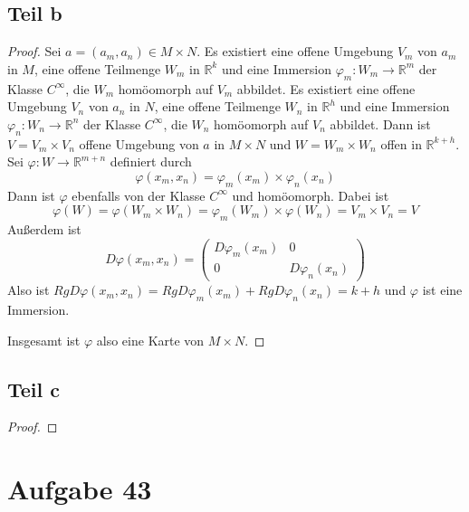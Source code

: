 \documentclass[10pt,a4paper]{article}
\begin{document}
\subsection{Teil b}
\begin{proof}
  Sei $a = (a_{m}, a_{n}) \in M \times N$.
  Es existiert eine offene Umgebung $V_{m}$ von $a_{m}$ in $M$, eine offene Teilmenge $W_{m}$ in $\mathbb{R}^{k}$ und eine Immersion $\varphi_{m} : W_{m} \rightarrow \mathbb{R}^{m}$ der Klasse $C^{\infty}$, die $W_{m}$ homöomorph auf $V_{m}$ abbildet.
  Es existiert eine offene Umgebung $V_{n}$ von $a_{n}$ in $N$, eine offene Teilmenge $W_{n}$ in $\mathbb{R}^{h}$ und eine Immersion $\varphi_{n} : W_{n} \rightarrow \mathbb{R}^{n}$ der Klasse $C^{\infty}$, die $W_{n}$ homöomorph auf $V_{n}$ abbildet.
  Dann ist $V = V_{m} \times V_{n}$ offene Umgebung von $a$ in $M \times N$ und $W = W_{m} \times W_{n}$ offen in $\mathbb{R}^{k + h}$.
  Sei $\varphi : W \rightarrow \mathbb{R}^{m + n}$ definiert durch
  \begin{equation}
    \varphi(x_{m}, x_{n}) = \varphi_{m}(x_{m}) \times \varphi_{n}(x_{n})
  \end{equation}
  Dann ist $\varphi$ ebenfalls von der Klasse $C^{\infty}$ und homöomorph.
  Dabei ist
  \begin{equation}
    \varphi(W) = \varphi(W_{m} \times W_{n}) = \varphi_{m}(W_{m}) \times \varphi(W_{n}) = V_{m} \times V_{n} = V
  \end{equation}
  Außerdem ist
  \begin{equation}
    D\varphi(x_{m}, x_{n}) = \begin{pmatrix}
      D\varphi_{m}(x_{m}) & 0\\
      0 & D\varphi_{n}(x_{n})
    \end{pmatrix}
  \end{equation}
  Also ist $Rg D\varphi(x_{m}, x_{n}) = Rg D\varphi_{m}(x_{m}) + Rg D\varphi_{n}(x_{n}) = k + h$ und $\varphi$ ist eine Immersion.

  Insgesamt ist $\varphi$ also eine Karte von $M \times N$.
\end{proof}

\subsection{Teil c}
\begin{proof}

\end{proof}

\section{Aufgabe 43}
\end{document}
